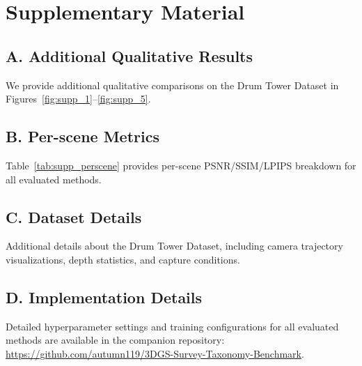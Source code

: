 \section*{Supplementary Material}
\label{sec:supplementary}

\subsection*{A. Additional Qualitative Results}

We provide additional qualitative comparisons on the Drum Tower Dataset
in Figures~\ref{fig:supp_1}--\ref{fig:supp_5}.


\subsection*{B. Per-scene Metrics}

Table~\ref{tab:supp_perscene} provides per-scene PSNR/SSIM/LPIPS
breakdown for all evaluated methods.


\subsection*{C. Dataset Details}

Additional details about the Drum Tower Dataset, including camera
trajectory visualizations, depth statistics, and capture conditions.


\subsection*{D. Implementation Details}

Detailed hyperparameter settings and training configurations for all
evaluated methods are available in the companion repository:
\url{https://github.com/autumn119/3DGS-Survey-Taxonomy-Benchmark}.
